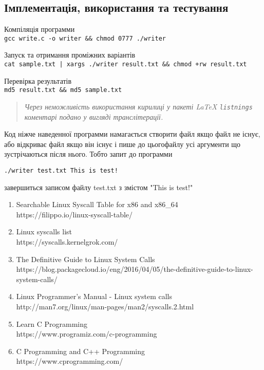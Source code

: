 \subsection{Імплементація, використання та тестування}

Компіляція программи \\
    \texttt{gcc write.c -o writer \&\& chmod 0777 ./writer}

Запуск та отримання проміжних варіантів \\
    \texttt{cat sample.txt | xargs ./writer result.txt \&\& chmod +rw result.txt}

Перевірка результатів \\
    \texttt{md5 result.txt \&\& md5 sample.txt}

    \begin{quote}
    \emph{Через неможливість використання кирилиці у пакеті LaTeX \texttt{listnings} коментарі подано у вигляді транслітерації.}
    \end{quote}

Код ніжче наведенної программи намагається створити файл якщо файл не існує, або відкриває файл якщо він існує і пише до цьогофайлу усі аргументи що зустрічаються після нього. Тобто запит до программи

\texttt{./writer test.txt This is test!}

завершиться записом файлу test.txt з змістом "This is test!"

\pagebreak



\pagebreak

  \begin{left}\small{}\end{left}
  \begin{enumerate}

    \item Searchable Linux Syscall Table for x86 and x86\_64 \\ https://filippo.io/linux-syscall-table/

    \item Linux syscalls list \\ https://syscalls.kernelgrok.com/

    \item The Definitive Guide to Linux System Calls \\ https://blog.packagecloud.io/eng/2016/04/05/the-definitive-guide-to-linux-system-calls/

    \item Linux Programmer's Manual - Linux system calls \\ http://man7.org/linux/man-pages/man2/syscalls.2.html

    \item Learn C Programming \\ https://www.programiz.com/c-programming

    \item C Programming and C++ Programming \\ https://www.cprogramming.com/
  \end{enumerate}
